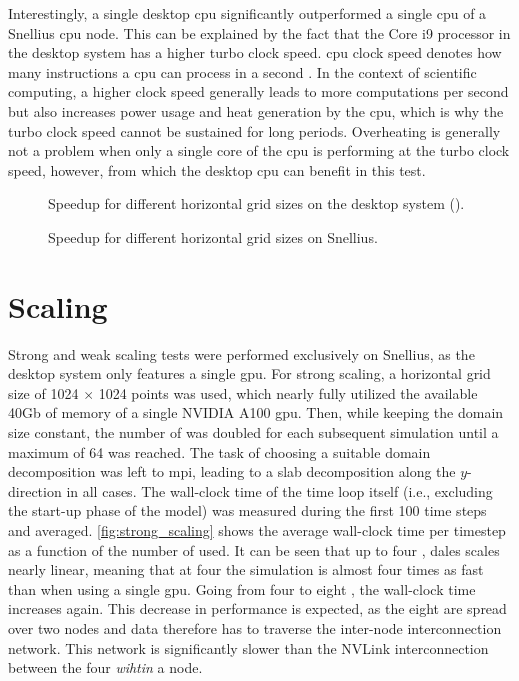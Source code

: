 Interestingly, a single desktop \acrshort{cpu} significantly outperformed a single \acrshort{cpu} of a Snellius \acrshort{cpu} node. This can be explained by the fact that the Core i9 processor in the desktop system has a higher turbo clock speed. \acrshort{cpu} clock speed denotes how many instructions a \acrshort{cpu} can process in a second \citep{rauberParallelProgrammingMulticore2023}. In the context of scientific computing, a higher clock speed generally leads to more computations per second but also increases power usage and heat generation by the \acrshort{cpu}, which is why the turbo clock speed cannot be sustained for long periods. Overheating is generally not a problem when only a single core of the \acrshort{cpu} is performing at the turbo clock speed, however, from which the desktop \acrshort{cpu} can benefit in this test.

\begin{figure}[h!]
    \centering
    
    \caption{Speedup for different horizontal grid sizes on the desktop system ().}
    \label{fig:speedup_desktop}
\end{figure}

\begin{figure}[h!]
    \centering
    
    \caption{Speedup for different horizontal grid sizes on Snellius.}
    \label{fig:speedup_snellius}
\end{figure}

\section{Scaling}
Strong and weak scaling tests were performed exclusively on Snellius, as the desktop system only features a single \acrshort{gpu}. For strong scaling, a horizontal grid size of 1024 $\times$ 1024 points was used, which nearly fully utilized the available 40Gb of memory of a single NVIDIA A100 \acrshort{gpu}. Then, while keeping the domain size constant, the number of  was doubled for each subsequent simulation until a maximum of 64  was reached. The task of choosing a suitable domain decomposition was left to \acrshort{mpi}, leading to a slab decomposition along the $y$-direction in all cases. The wall-clock time of the time loop itself (i.e., excluding the start-up phase of the model) was measured during the first 100 time steps and averaged. \autoref{fig:strong_scaling} shows the average wall-clock time per timestep as a function of the number of  used. It can be seen that up to four , \acrshort{dales} scales nearly linear, meaning that at four  the simulation is almost four times as fast than when using a single \acrshort{gpu}. Going from four to eight , the wall-clock time increases again. This decrease in performance is expected, as the eight  are spread over two nodes and data therefore has to traverse the inter-node interconnection network. This network is significantly slower than the NVLink interconnection between the four  \emph{wihtin} a node.

